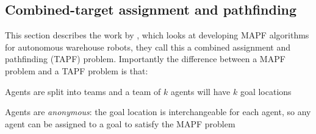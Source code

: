 \documentclass[a4paper,11pt]{article}
\begin{document}
%
%
%
%

%
%

\subsection{Combined-target assignment and pathfinding} \label{sec:tapf}
This section describes the work by \cite{ma2016optimal}, which looks at developing MAPF algorithms for autonomous warehouse robots, they call this a combined assignment and pathfinding (TAPF) problem. Importantly the difference between a MAPF problem and a TAPF problem is that:

\begin{compactitem}
	\item Agents are split into teams and a team of $k$ agents will have $k$ goal locations
	\item Agents are \textit{anonymous}: the goal location is interchangeable for each agent, so any agent can be assigned to a goal to satisfy the MAPF problem
\end{compactitem}
\end{document}

